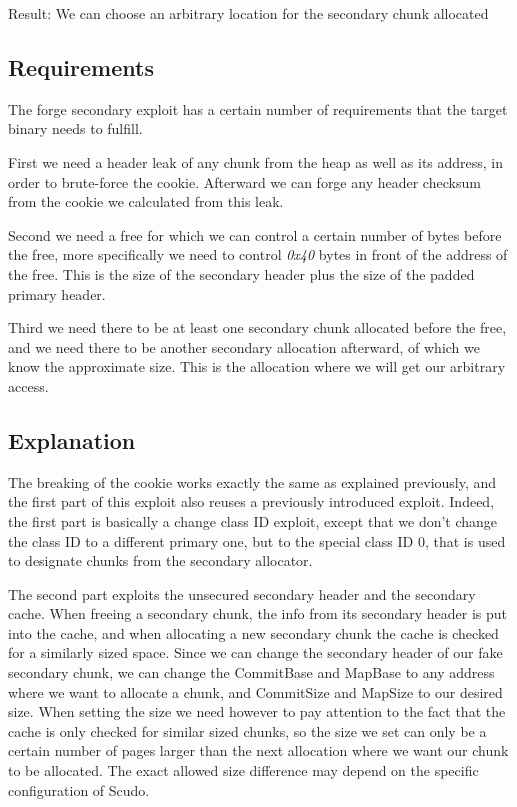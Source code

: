 \documentclass[a4paper,11pt,oneside]{report}
\begin{document}
Result: We can choose an arbitrary location for the secondary chunk allocated

\subsection{Requirements}

The forge secondary exploit has a certain number of requirements that the target binary
needs to fulfill.

First we need a header leak of any chunk from the heap as well as its address, in
order to brute-force the cookie. Afterward we can forge any header checksum from the
cookie we calculated from this leak.

Second we need a free for which we can control a certain number of bytes before the free,
more specifically we need to control \emph{0x40} bytes in front of the address of the
free. This is the size of the secondary header plus the size of the padded primary header.

Third we need there to be at least one secondary chunk allocated before the free, and we
need there to be another secondary allocation afterward, of which we know the approximate
size. This is the allocation where we will get our arbitrary access.

\subsection{Explanation}

The breaking of the cookie works exactly the same as explained previously, and the first
part of this exploit also reuses a previously introduced exploit. Indeed, the first part is
basically a change class ID exploit, except that we don't change the class ID to a
different primary one, but to the special class ID 0, that is used to designate chunks
from the secondary allocator.

The second part exploits the unsecured secondary header and the secondary cache. When
freeing a secondary chunk, the info from its secondary header is put into the cache, and
when allocating a new secondary chunk the cache is checked for a similarly sized
space. Since we can change the secondary header of our fake secondary chunk, we can change
the CommitBase and MapBase to any address where we want to allocate a chunk, and
CommitSize and MapSize to our desired size. When setting the size we need however to pay
attention to the fact that the cache is only checked for similar sized chunks, so the size
we set can only be a certain number of pages larger than the next allocation where we want
our chunk to be allocated. The exact allowed size difference may depend on the specific
configuration of Scudo.
\end{document}
